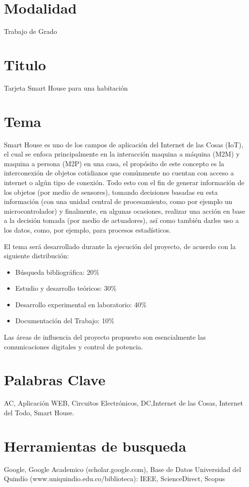	\section{Modalidad}
	Trabajo de Grado
	\section{Titulo}
	Tarjeta Smart House para una habitación
	\section{Tema}
	Smart House es uno de los campos de aplicación del Internet de las Cosas (IoT), el cual se enfoca principalmente en la interacción maquina a máquina (M2M) y maquina a persona (M2P) en una casa, el propósito de este concepto es la interconexión de objetos cotidianos que comúnmente no cuentan con acceso a internet o algún tipo de conexión. Todo esto con el fin de generar información de los objetos (por medio de sensores), tomando decisiones basadas en esta información (con una unidad central de procesamiento, como por ejemplo un microcontrolador) y finalmente, en algunas ocasiones, realizar una acción en base a la decisión tomada (por medio de actuadores), así como también darles uso a los datos, como, por ejemplo, para procesos estadísticos.  
	
	El tema será desarrollado durante la ejecución del proyecto, de acuerdo con la siguiente distribución:
	\begin{itemize}
		\item Búsqueda bibliográfica:			20\%
		\item Estudio y desarrollo teóricos:		30\%
		\item Desarrollo experimental en laboratorio:	40\%
		\item Documentación del Trabajo:		10\%
	\end{itemize}
	Las áreas de influencia del proyecto propuesto son esencialmente las comunicaciones digitales y control de potencia. \\
	
	\section{Palabras Clave}
	
	AC, Aplicación WEB, Circuitos Electrónicos, DC,Internet de las Cosas, Internet del Todo, Smart House.
	
	\section{Herramientas de busqueda}
	
	Google, Google Academico (scholar.google.com), Base de Datos Universidad del Quindío (www.uniquindio.edu.co/biblioteca): IEEE, ScienceDirect, Scopus